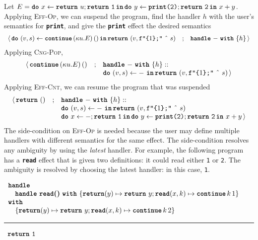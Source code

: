 Let $E = \texttt{\textbf{do}} \,\, {x} \leftarrow {\texttt{\textbf{return}} \,\, {u};\texttt{\textbf{return}} \,\, {\texttt{1}}} \, \textbf{\texttt{in}} \, {{\texttt{\textbf{do}} \,\, {y} \leftarrow {\texttt{\textbf{print}(2)};\texttt{\textbf{return}} \,\, {\texttt{2}}} \, \textbf{\texttt{in}} \, {\, x + y}}}$. Applying \textsc{Eff-Op}, we can suspend the program, find the handler $h$ with the user's semantics for \textbf{\texttt{print}}, and give the \textbf{\texttt{print}} effect the desired semantics
{  \arraycolsep=3pt
\small
\[\begin{array}{rcl}
  \langle \, \texttt{\textbf{do}} \,\, {(v, s)} \leftarrow {\textbf{\texttt{continue}} \, {(\kappa{} u. E)} \, {()}} \, \textbf{\texttt{in}} \, {\texttt{\textbf{return}} \,\, {(v, \texttt{f"\{$1$\};"} \text{ \^\ } s)}} &;& \textbf{\texttt{handle}} \,\, {-} \,\, \textbf{\texttt{with}} \,\, \{{h}\} \, \rangle
\end{array}
  \]
}
Applying \textsc{Cng-Pop},
{  \arraycolsep=3pt
\small
\[\begin{array}{rcl}
  \langle \, \textbf{\texttt{continue}} \, {(\kappa{} u. E)} \, {()} &;& \textbf{\texttt{handle}} \,\, {-} \,\, \textbf{\texttt{with}} \,\, \{{h}\} :: \\
                              && \texttt{\textbf{do}} \,\, {(v, s)} \leftarrow {-\,} \, \textbf{\texttt{in}} \, {\texttt{\textbf{return}} \,\, {(v, \texttt{f"\{$1$\};"} \text{ \^\ } s)}} \, \rangle
\end{array}
  \]
}
Applying \textsc{Eff-Cnt}, we can resume the program that was suspended
{  \arraycolsep=3pt
\small
\[\begin{array}{rcl}
  \langle \, \texttt{\textbf{return}} \,\, {()} &;& \textbf{\texttt{handle}} \,\, {-} \,\, \textbf{\texttt{with}} \,\, \{{h}\} :: \\
                              && \texttt{\textbf{do}} \,\, {(v, s)} \leftarrow {-\,} \, \textbf{\texttt{in}} \, {\texttt{\textbf{return}} \,\, {(v, \texttt{f"\{$1$\};"} \text{ \^\ } s)}} \\
                              && \texttt{\textbf{do}} \,\, {x} \leftarrow {-;\texttt{\textbf{return}} \,\, {\texttt{1}}} \, \textbf{\texttt{in}} \, {{\texttt{\textbf{do}} \,\, {y} \leftarrow {\texttt{\textbf{print}(2)};\texttt{\textbf{return}} \,\, {\texttt{2}}} \, \textbf{\texttt{in}} \, {\, x + y}}} \, \rangle
\end{array}
  \]
}
The side-condition on \textsc{Eff-Op} is needed because the user may define multiple handlers with different semantics for the same effect. The side-condition resolves any ambiguity by using the \textit{latest} handler. For example, the following program has a \textbf{\texttt{read}} effect that is given two definitions: it could read either \texttt{1} or \texttt{2}. The ambiguity is resolved by choosing the latest handler: in this case, \texttt{1}.
\begin{eff}
$\begin{array}{l}
  \textbf{\texttt{handle}} \\
  \quad \textbf{\texttt{handle}} \,\, {\textbf{\texttt{read}()}} \,\, \textbf{\texttt{with}} \,\, \{{\textbf{\texttt{return}}(y) \mapsto \texttt{\textbf{return}} \,\, {y}; \textbf{\texttt{read}}(x, k) \mapsto {\textbf{\texttt{continue}} \, {k} \, {1}}}\} \\
  \textbf{\texttt{with}} \\ 
  \quad \{ \textbf{\texttt{return}}(y) \mapsto \texttt{\textbf{return}} \,\, {y}; \textbf{\texttt{read}}(x, k) \mapsto {\textbf{\texttt{continue}} \, {k} \, {2}} \}
\end{array}$ 

\vspace{2mm} 
\textcolor{effComment}{\hrule height 0.2mm \relax}
\vspace{2mm} 

\textcolor{effComment}{$\begin{array}{l}\texttt{\textbf{return}} \,\, {\texttt{1}}\end{array}$}
\end{eff}


